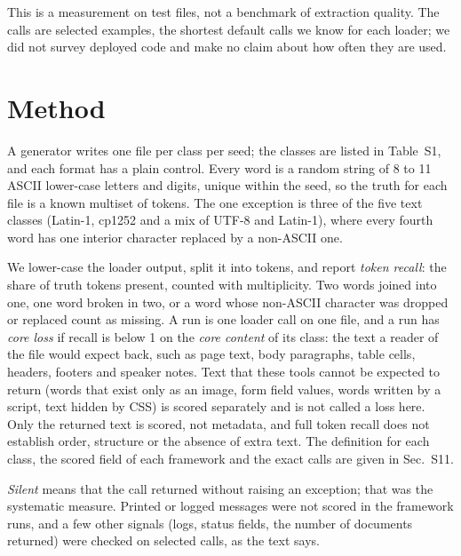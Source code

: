 \documentclass[aps,pre,twocolumn,superscriptaddress,nofootinbib,10pt]{revtex4-2}
\begin{document}
This is a measurement on test files, not a benchmark of extraction quality. The calls are selected examples, the shortest default calls we know for each loader; we did not survey deployed code and make no claim about how often they are used.

\section{Method}
A generator writes one file per class per seed; the classes are listed in Table~S1, and each format has a plain control. Every word is a random string of 8 to 11 ASCII lower-case letters and digits, unique within the seed, so the truth for each file is a known multiset of tokens. The one exception is three of the five text classes (Latin-1, cp1252 and a mix of UTF-8 and Latin-1), where every fourth word has one interior character replaced by a non-ASCII one.

We lower-case the loader output, split it into tokens, and report \emph{token recall}: the share of truth tokens present, counted with multiplicity. Two words joined into one, one word broken in two, or a word whose non-ASCII character was dropped or replaced count as missing. A run is one loader call on one file, and a run has \emph{core loss} if recall is below 1 on the \emph{core content} of its class: the text a reader of the file would expect back, such as page text, body paragraphs, table cells, headers, footers and speaker notes. Text that these tools cannot be expected to return (words that exist only as an image, form field values, words written by a script, text hidden by CSS) is scored separately and is not called a loss here. Only the returned text is scored, not metadata, and full token recall does not establish order, structure or the absence of extra text. The definition for each class, the scored field of each framework and the exact calls are given in Sec.~S11.

\emph{Silent} means that the call returned without raising an exception; that was the systematic measure. Printed or logged messages were not scored in the framework runs, and a few other signals (logs, status fields, the number of documents returned) were checked on selected calls, as the text says.
\end{document}
